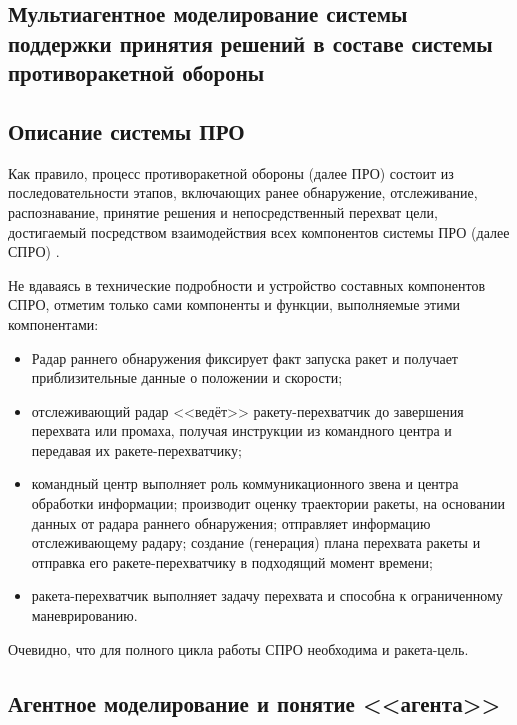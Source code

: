 \parindent=1cm %

\begin{center}
		
		\section{Мультиагентное моделирование системы поддержки принятия решений в составе системы противоракетной обороны}
		
\end{center}

\subsection{Описание системы ПРО} 

Как правило, процесс противоракетной обороны (далее ПРО) состоит из последовательности этапов, включающих ранее обнаружение, отслеживание, распознавание, принятие решения и непосредственный перехват цели, достигаемый посредством взаимодействия всех компонентов системы ПРО (далее СПРО) \cite{Lynch:2013}. 

Не вдаваясь в технические подробности и устройство составных компонентов СПРО, отметим только сами компоненты и функции, выполняемые этими компонентами:

\begin{itemize}
	\item Радар раннего обнаружения фиксирует факт запуска ракет и получает приблизительные данные о положении и скорости;
	\item отслеживающий радар <<ведёт>> ракету-перехватчик до завершения перехвата или промаха, получая инструкции из командного центра и передавая их ракете-перехватчику;
	\item командный центр выполняет роль коммуникационного звена и центра обработки информации; производит оценку траектории ракеты, на основании  данных от радара раннего обнаружения; отправляет информацию отслеживающему радару;  создание (генерация) плана перехвата ракеты и отправка его ракете-перехватчику в подходящий момент времени;
	\item ракета-перехватчик выполняет задачу перехвата и способна к ограниченному маневрированию.
\end{itemize} 

Очевидно, что для полного цикла работы СПРО необходима и ракета-цель. 


\subsection{Агентное моделирование и понятие <<агента>>}


